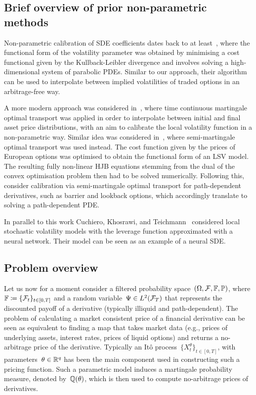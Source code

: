 \subsection{Brief overview of prior non-parametric methods}

Non-parametric calibration of SDE coefficients dates back to at least~\cite{Avellaneda1997CalibratingMinimization}, where the functional form of the volatility parameter was obtained by minimising a cost functional given by the Kullback-Leibler divergence and involves solving a high-dimensional system of parabolic PDEs. Similar to our approach, their algorithm can be used to interpolate between implied volatilities of traded options in an arbitrage-free way.

A more modern approach was considered in~\cite{Guo2017LocalTransport}, where time continuous martingale optimal transport was applied in order to interpolate between initial and final asset price distributions, with an aim to calibrate the local volatility function in a non-parametric way. 
Similar idea was considered in~\cite{Guo2022CalibrationTransport}, where semi-martingale optimal transport was used instead. 
The cost function given by the prices of European options was optimised to obtain the functional form of an LSV model. The resulting fully non-linear HJB equations stemming from the dual of the convex optimisation problem then had to be solved numerically. Following this, \cite{Guo2018PathDerivatives} consider calibration via semi-martingale optimal transport for path-dependent derivatives, such as barrier and lookback options, which  accordingly translate to solving a path-dependent PDE.

In parallel to this work Cuchiero, Khosrawi, and Teichmann~\cite{Cuchiero2020AModels} considered local stochastic volatility models with the leverage function approximated with a neural network. Their model can be seen as an example of a neural SDE.

\subsection{Problem overview}\label{sec problem overview}

Let us now for a moment consider a filtered probability space~$(\Omega, \mathcal{F}, \mathbb{F},\mathbb{P})$, where ${\mathbb{F}\coloneqq \{\mathcal{F}_t\}_{t\in[0,T]}}$ and a random variable~$\Psi \in L^2(\mathcal{F}_T)$ that represents the discounted payoff of a derivative (typically illiquid and path-dependent). 
The problem of calculating a market consistent price of a financial derivative can be seen as equivalent to finding a map that takes market data (e.g., prices of underlying assets, interest rates, prices of liquid options) and returns a no-arbitrage price of the derivative.
Typically an It\^{o} process~$\{X_t^\theta\}_{{t}\in[0,T]}$, with parameters~$\theta \in \mathbb{R}^q$ has been the main component used in constructing such a pricing function. 
Such a parametric model induces a martingale probability measure, denoted by~$\mathbb{Q}(\theta)$, which is then used to compute no-arbitrage prices of derivatives.

